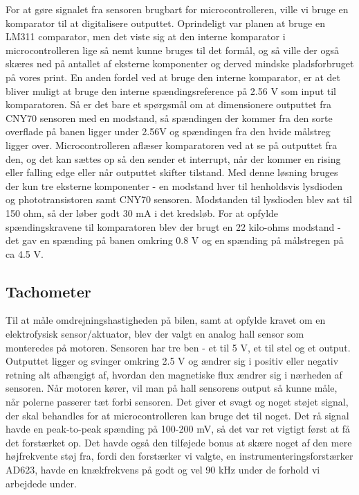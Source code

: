 For at gøre signalet fra sensoren brugbart for microcontrolleren, ville vi bruge en komparator til at digitalisere outputtet. Oprindeligt var planen at bruge en LM311 comparator, men det viste sig at den interne komparator i microcontrolleren lige så nemt kunne bruges til det formål, og så ville der også skæres ned på antallet af eksterne komponenter og derved mindske pladsforbruget på vores print. En anden fordel ved at bruge den interne komparator, er at det bliver muligt at bruge den interne spændingsreference på 2.56 V som input til komparatoren. Så er det bare et spørgsmål om at dimensionere outputtet fra CNY70 sensoren med en modstand, så spændingen der kommer fra den sorte overflade på banen ligger under 2.56V og spændingen fra den hvide målstreg ligger over. Microcontrolleren aflæser komparatoren ved at se på outputtet fra den, og det kan sættes op så den sender et interrupt, når der kommer en rising eller falling edge eller når outputtet skifter tilstand. Med denne løsning bruges der kun tre eksterne komponenter - en modstand hver til henholdsvis lysdioden og phototransistoren samt CNY70 sensoren. Modstanden til lysdioden blev sat til 150 ohm, så der løber godt 30 mA i det kredsløb. For at opfylde spændingskravene til komparatoren blev der brugt en 22 kilo-ohms modstand - det gav en spænding på banen omkring 0.8 V og en spænding på målstregen på ca 4.5 V.

\subsection{Tachometer}

Til at måle omdrejningshastigheden på bilen, samt at opfylde kravet om en elektrofysisk sensor/aktuator, blev der valgt en analog hall sensor som monteredes på motoren. Sensoren har tre ben - et til 5 V, et til stel og et output. Outputtet ligger og svinger omkring 2.5 V og ændrer sig i positiv eller negativ retning alt afhængigt af, hvordan den magnetiske flux ændrer sig i nærheden af sensoren. Når motoren kører, vil man på hall sensorens output så kunne måle, når polerne passerer tæt forbi sensoren. Det giver et svagt og noget støjet signal, der skal behandles for at microcontrolleren kan bruge det til noget. Det rå signal havde en peak-to-peak spænding på 100-200 mV, så det var ret vigtigt først at få det forstærket op. Det havde også den tilføjede bonus at skære noget af den mere højfrekvente støj fra, fordi den forstærker vi valgte, en instrumenteringsforstærker AD623, havde en knækfrekvens på godt og vel 90 kHz under de forhold vi arbejdede under. 

